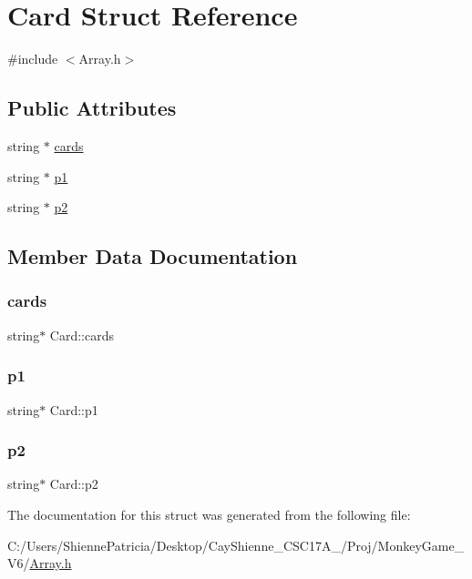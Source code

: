 \hypertarget{struct_card}{}\section{Card Struct Reference}
\label{struct_card}


{\ttfamily \#include $<$Array.\+h$>$}

\subsection*{Public Attributes}
\begin{DoxyCompactItemize}
\item 
string $\ast$ \hyperlink{struct_card_a3e3dcf05b4dd2dc5c0912068313701b2}{cards}
\item 
string $\ast$ \hyperlink{struct_card_aa4091225d41dc493be8338c4bd7cd328}{p1}
\item 
string $\ast$ \hyperlink{struct_card_a74435284e52d8899c46c8dd159b0a763}{p2}
\end{DoxyCompactItemize}


\subsection{Member Data Documentation}
\mbox{\label{struct_card_a3e3dcf05b4dd2dc5c0912068313701b2}} 
\subsubsection{\texorpdfstring{cards}{cards}}
{\footnotesize\ttfamily string$\ast$ Card\+::cards}

\mbox{\label{struct_card_aa4091225d41dc493be8338c4bd7cd328}} 
\subsubsection{\texorpdfstring{p1}{p1}}
{\footnotesize\ttfamily string$\ast$ Card\+::p1}

\mbox{\label{struct_card_a74435284e52d8899c46c8dd159b0a763}} 
\subsubsection{\texorpdfstring{p2}{p2}}
{\footnotesize\ttfamily string$\ast$ Card\+::p2}



The documentation for this struct was generated from the following file\+:\begin{DoxyCompactItemize}
\item 
C\+:/\+Users/\+Shienne\+Patricia/\+Desktop/\+Cay\+Shienne\+\_\+\+C\+S\+C17\+A\+\_/\+Proj/\+Monkey\+Game\+\_\+\+V6/\hyperlink{_array_8h}{Array.\+h}\end{DoxyCompactItemize}

